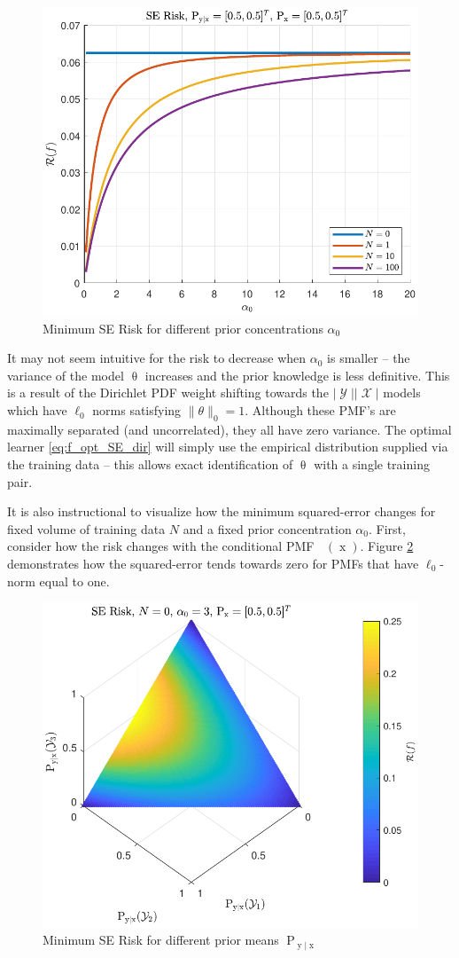 \documentclass[12pt]{report}
\DeclareMathOperator{\xrm}{\mathrm{x}}
\DeclareMathOperator{\yrm}{\mathrm{y}}
\DeclareMathOperator{\Prm}{\mathrm{P}}
\DeclareMathOperator{\Xcal}{\mathcal{X}}
\DeclareMathOperator{\Ycal}{\mathcal{Y}}
\DeclareMathOperator{\alphac}{\alpha_\text{c}}
\begin{document}
\begin{figure}
\centering
\includegraphics[width=0.7\linewidth]{Risk_SE_Dir_IO_a0_leg_N.pdf}
\caption{Minimum SE Risk for different prior concentrations $\alpha_0$}
\label{fig:Risk_SE_Dir_IO_a0_leg_N}
\end{figure}

It may not seem intuitive for the risk to decrease when $\alpha_0$ is smaller -- the variance of the model $\uptheta$ increases and the prior knowledge is less definitive. This is a result of the Dirichlet PDF weight shifting towards the $|\Ycal||\Xcal|$ models which have $\ell_0$ norms satisfying $\| \theta \|_0 = 1$. Although these PMF's are maximally separated (and uncorrelated), they all have zero variance. The optimal learner \eqref{eq:f_opt_SE_dir} will simply use the empirical distribution supplied via the training data -- this allows exact identification of $\uptheta$ with a single training pair.

It is also instructional to visualize how the minimum squared-error changes for fixed volume of training data $N$ and a fixed prior concentration $\alpha_0$. First, consider how the risk changes with the conditional PMF $\alphac(\xrm)$. Figure \ref{fig:Risk_SE_Dir_IO_Pyx} demonstrates how the squared-error tends towards zero for PMFs that have $\ell_0$-norm equal to one.
\begin{figure}
\centering
\includegraphics[width=0.7\linewidth]{Risk_SE_Dir_IO_Pyx.pdf}
\caption{Minimum SE Risk for different prior means $\Prm_{\yrm | \xrm}$}
\label{fig:Risk_SE_Dir_IO_Pyx}
\end{figure}
\end{document}

